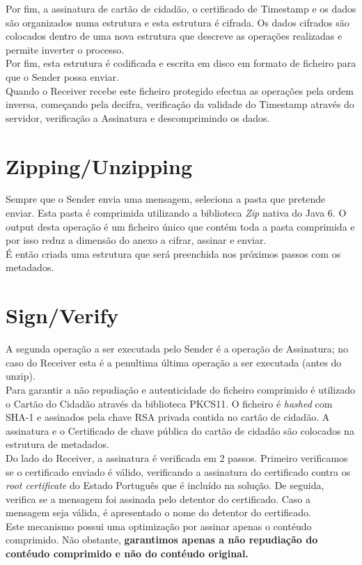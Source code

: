 Por fim, a assinatura de cartão de cidadão, o certificado de Timestamp e os dados são organizados numa estrutura e esta estrutura é cifrada. Os dados cifrados são colocados dentro de uma nova estrutura que descreve as operações realizadas e permite inverter o processo.\\
 Por fim, esta estrutura é codificada e escrita em disco em formato de ficheiro para que o Sender possa enviar. \\
 
 
Quando o Receiver recebe este ficheiro protegido efectua as operações pela ordem inversa, começando pela decifra, verificação da validade do Timestamp através do servidor, verificação a Assinatura e descomprimindo os dados.

\section{Zipping/Unzipping}
Sempre que o Sender envia uma mensagem, seleciona a pasta que pretende enviar. Esta pasta é comprimida utilizando a biblioteca \textit{Zip} nativa do Java 6. O output desta operação é um ficheiro único que contém toda a pasta comprimida e por isso reduz a dimensão do anexo a cifrar, assinar e enviar.\\
É então criada uma estrutura que será preenchida nos próximos passos com os metadados.
\section{Sign/Verify}
A segunda operação a ser executada pelo Sender é a operação de Assinatura; no caso do Receiver esta é a penultima última operação a ser executada (antes do unzip). \\
Para garantir a não repudiação e autenticidade do ficheiro comprimido é utilizado o Cartão do Cidadão através da biblioteca PKCS11. O ficheiro é \textit{hashed} com SHA-1 e assinados pela chave RSA privada contida no cartão de cidadão. A assinatura e o Certificado de chave pública do cartão de cidadão são colocados na estrutura de metadados. \\

Do lado do Receiver, a assinatura é verificada em 2 passos. Primeiro verificamos se o certificado enviado é válido, verificando a assinatura do certificado contra os \textit{root certificate} do Estado Português que é incluído na solução. De seguida, verifica se a mensagem foi assinada pelo detentor do certificado. Caso a mensagem seja válida, é apresentado o nome do detentor do certificado.\\
Este mecanismo possui uma optimização por assinar apenas o contéudo comprimido. Não obstante,\textbf{ garantimos apenas a não repudiação do contéudo comprimido e não do contéudo original.} 


